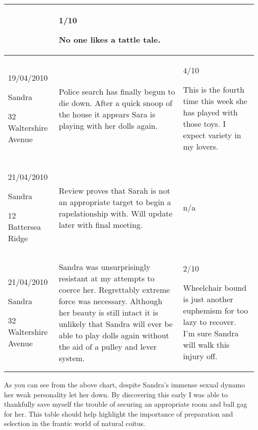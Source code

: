 \begin{longtable}{| p{} | p{} | p{} |}
&

1/10

No one likes a tattle tale.

\\
\hline

19/04/2010

Sandra

32 Waltershire Avenue
        
&

Police search has finally begun to die down. After a quick snoop of the house it appears Sara is playing with her dolls again.
  
&
     

4/10

This is the fourth time this week she has played with those toys. I expect variety in my lovers.

\\
\hline

21/04/2010

Sandra

12 Battersea Ridge
       
 &

Review proves that Sarah is not an appropriate target to begin a rapelationship with. Will update later with final meeting.
      
  &

n/a

\\
\hline

21/04/2010


Sandra

32 Waltershire Avenue
        
&

Sandra was unsurprisingly resistant at my attempts to coerce her. Regrettably extreme force was necessary. Although her beauty is still intact it is unlikely that Sandra will ever be able to play dolls again without the aid of a pulley and lever system.

&    

2/10

Wheelchair bound is just another euphemism for too lazy to recover. I’m sure Sandra will walk this injury off.

\\
\hline
\end{longtable}

As you can see from the above chart, despite Sandra’s immense sexual dynamo her 
weak personality let her down. By discovering this early I was able to 
thankfully save myself the trouble of securing an appropriate room and ball gag 
for her. This table should help highlight the importance of preparation and 
selection in the frantic world of natural coitus.